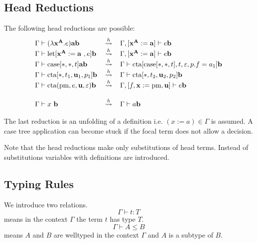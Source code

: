 \subsection{Head Reductions}

The following head reductions are possible:
$$
\begin{array}{llll}
        \Gamma \vdash (\lambda \vec x^{\vec A}. e) \vec a \vec b
        &\hreduce&
        \Gamma, [\vec x^{\vec A} := \vec a] \vdash e \vec b
        \\
        \Gamma \vdash \llet[\vec x^{\vec A} := \vec a , e] \vec b
        &\hreduce&
        \Gamma, [\vec x^{\vec A} := \vec a] \vdash e \vec b
        \\
        \Gamma \vdash \case[*, *, t] \vec a \vec b
        &\hreduce&
        \Gamma \vdash \cta[\case[*,*,t], t, \empty, p.f = a_1] \vec b
        \\
        \Gamma \vdash \cta[*, t_1, \vec u_1, p_1] \vec b
        &\hreduce&
        \Gamma \vdash \cta[*, t_2, \vec u_2, p_2] \vec b
        \\
        \Gamma
        \vdash
        \cta(\text{pm}, e, \vec u, \empty) \vec b
        &\hreduce&
        \Gamma, [f,\vec x := \text{pm}, \vec u]
        \vdash
        e \vec b
        \\
        \\
        \Gamma \vdash x \vec b
        &\hreduce&
        \Gamma \vdash a \vec b
\end{array}
$$

The last reduction is an unfolding of a definition i.e. $(x:=a) \in \Gamma$ is
assumed. A case tree application can become stuck if the focal term does not
allow a decision.

Note that the head reductions make only substitutions of head terms. Instead of
substitutions variables with definitions are introduced.






\subsection{Typing Rules}

We introduce two relations.
$$
\Gamma \vdash t: T
$$
means in the context $\Gamma$ the term $t$ has type $T$.
$$
\Gamma \vdash A \le B
$$
means $A$ and $B$ are welltyped in the context $\Gamma$ and $A$ is a subtype of
$B$.





